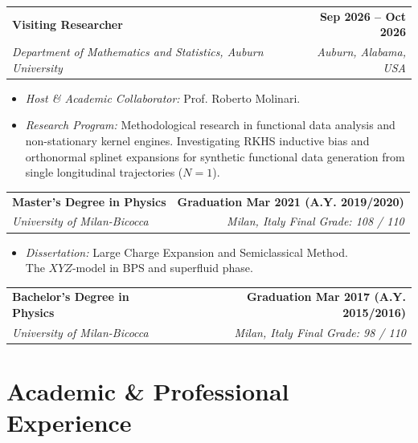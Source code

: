 \documentclass[10pt,a4paper]{article}
\makeatletter
\newcommand{\cventry}[5]{
  \vspace{2pt}
  \noindent
  \begin{tabularx}{\textwidth}{@{}X r@{}}
    \textbf{#1} & \textcolor{secondary}{\textbf{#2}} \\
    \textit{#3} & \textit{\textcolor{textdark}{#4}}
  \end{tabularx}
  \vspace{-1pt}
  {\small #5}
  \vspace{2pt}
}
\newcommand{\cvsimpleentry}[4]{
  \vspace{2pt}
  \noindent
  \begin{tabularx}{\textwidth}{@{}X r@{}}
    \textbf{#1} & \textcolor{secondary}{\textbf{#2}} \\
    \textit{#3} & \textit{\textcolor{textdark}{#4}}
  \end{tabularx}
  \vspace{1pt}
}
\makeatother
\begin{document}
\cventry{Visiting Researcher}{Sep 2026 -- Oct 2026}
{Department of Mathematics and Statistics, Auburn University}{Auburn, Alabama, USA}
{
\begin{itemize}
    \item \textit{Host \& Academic Collaborator:} Prof. Roberto Molinari.
    \item \textit{Research Program:} Methodological research in functional data analysis and non-stationary kernel engines. Investigating RKHS inductive bias and orthonormal splinet expansions for synthetic functional data generation from single longitudinal trajectories ($N = 1$).
\end{itemize}
}

\cventry{Master's Degree in Physics}{Graduation Mar 2021 (A.Y. 2019/2020)}
{University of Milan-Bicocca}{Milan, Italy \;\textbar\; Final Grade: 108 / 110}
{
\begin{itemize}
    \item \textit{Dissertation:} Large Charge Expansion and Semiclassical Method.\\The $XYZ$-model in BPS and superfluid phase.
\end{itemize}
}

\cvsimpleentry{Bachelor's Degree in Physics}{Graduation Mar 2017 (A.Y. 2015/2016)}
{University of Milan-Bicocca}{Milan, Italy \;\textbar\; Final Grade: 98 / 110}




\newpage


\section{Academic \& Professional Experience}
\end{document}
